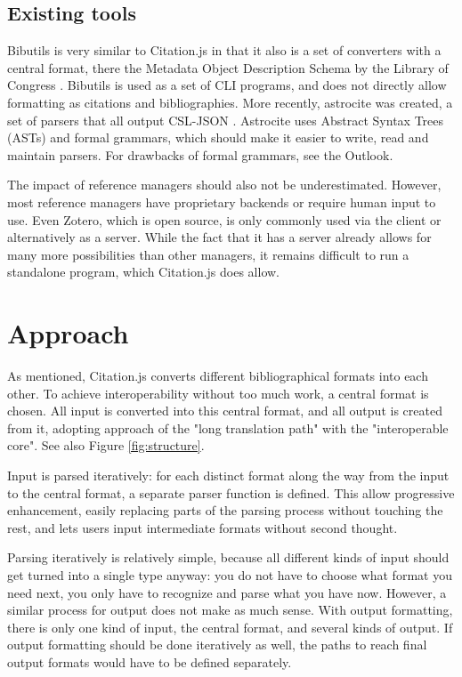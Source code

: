 \documentclass[fleqn,10pt,lineno]{wlpeerj} %
\begin{document}
\subsection*{Existing tools}

Bibutils is very similar to Citation.js in that it also is a set of converters with a central format, there the Metadata Object Description Schema by the Library of Congress \citep{putnam2005bibutils}. Bibutils is used as a set of CLI programs, and does not directly allow formatting as citations and bibliographies. More recently, astrocite was created, a set of parsers that all output CSL-JSON \citep{Sifford2019dsifford/astrocite}. Astrocite uses Abstract Syntax Trees (ASTs) and formal grammars, which should make it easier to write, read and maintain parsers. For drawbacks of formal grammars, see the Outlook.

The impact of reference managers should also not be underestimated. However, most reference managers have proprietary backends or require human input to use. Even Zotero, which is open source, is only commonly used via the client or alternatively as a server. While the fact that it has a server already allows for many more possibilities than other managers, it remains difficult to run a standalone program, which Citation.js does allow.

\section*{Approach}

As mentioned, Citation.js converts different bibliographical formats into each other. To achieve interoperability without too much work, a central format is chosen. All input is converted into this central format, and all output is created from it, adopting \cite{godby_two_2003} approach of the "long translation path" with the "interoperable core". See also Figure \ref{fig:structure}.

Input is parsed iteratively: for each distinct format along the way from the input to the central format, a separate parser function is defined. This allow progressive enhancement, easily replacing parts of the parsing process without touching the rest, and lets users input intermediate formats without second thought.

Parsing iteratively is relatively simple, because all different kinds of input should get turned into a single type anyway: you do not have to choose what format you need next, you only have to recognize and parse what you have now. However, a similar process for output does not make as much sense. With output formatting, there is only one kind of input, the central format, and several kinds of output. If output formatting should be done iteratively as well, the paths to reach final output formats would have to be defined separately.
\end{document}
